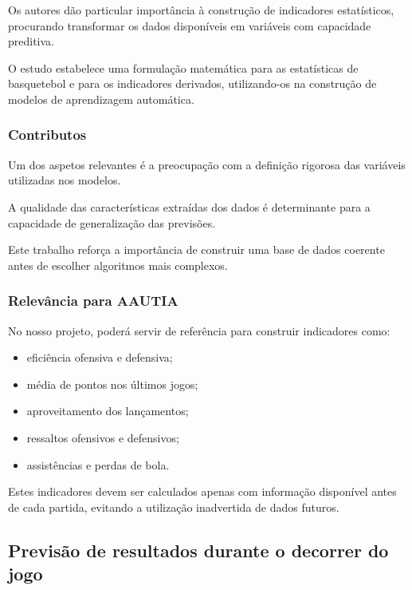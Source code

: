 Os autores dão particular importância à construção de indicadores estatísticos, procurando transformar os dados disponíveis em variáveis com capacidade preditiva.

O estudo estabelece uma formulação matemática para as estatísticas de basquetebol e para os indicadores derivados, utilizando-os na construção de modelos de aprendizagem automática.

\subsubsection{Contributos}\label{aautia:contributos}

Um dos aspetos relevantes é a preocupação com a definição rigorosa das variáveis utilizadas nos modelos.

A qualidade das características extraídas dos dados é determinante para a capacidade de generalização das previsões.

Este trabalho reforça a importância de construir uma base de dados coerente antes de escolher algoritmos mais complexos.

\subsubsection{Relevância para AAUTIA}\label{aautia:relevuxe2ncia-para-aautia-2}

No nosso projeto, poderá servir de referência para construir indicadores como:

\begin{itemize}
\tightlist
\item
  eficiência ofensiva e defensiva;
\item
  média de pontos nos últimos jogos;
\item
  aproveitamento dos lançamentos;
\item
  ressaltos ofensivos e defensivos;
\item
  assistências e perdas de bola.
\end{itemize}

Estes indicadores devem ser calculados apenas com informação disponível antes de cada partida, evitando a utilização inadvertida de dados futuros.

\subsection{Previsão de resultados durante o decorrer do jogo}\label{aautia:previsuxe3o-de-resultados-durante-o-decorrer-do-jogo}

